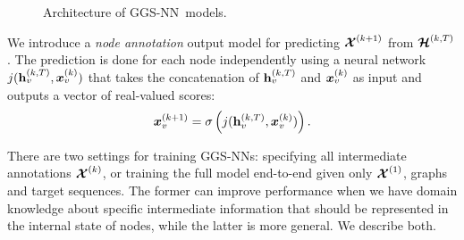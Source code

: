 \documentclass{article} %
\newcommand{\OurMethodShort}{GGS-NN}
\newcommand{\OurMethodShorts}{\OurMethodShort s}
\begin{document}
\begin{figure}[t]
  \begin{center}
  \end{center}
  \vspace{-2ex}
  \caption{Architecture of \OurMethodShort~models.}
  \vspace{-2ex}
  \label{fig:seq-architecture2}
\end{figure}

We introduce a \emph{node annotation} output model for predicting $\boldsymbol{\mathcal{X}}^{(k+1)}$
from $\boldsymbol{\mathcal{H}}^{(k,T)}$. The prediction is done for each node independently using
a neural network $j(\mathbf{h}_{v}^{(k,T)}, \boldsymbol{x}_v^{(k)})$ that takes the
concatenation of $\mathbf{h}_{v}^{(k,T)}$ and $\boldsymbol{x}_v^{(k)}$ as input and outputs a vector of
real-valued scores:
\begin{equation}
    \boldsymbol{x}_v^{(k+1)} = \sigma\left(j(\mathbf{h}_{v}^{(k,T)},
    \boldsymbol{x}_v^{(k)})\right).
\end{equation}

There are two settings for training \OurMethodShorts: specifying
all intermediate annotations $\boldsymbol{\mathcal{X}}^{(k)}$, or training the full model end-to-end given only
$\boldsymbol{\mathcal{X}}^{(1)}$, graphs and target sequences.
The former can improve performance when we have domain knowledge about specific
intermediate information that should be represented in the internal state of
nodes, while the latter is more general. We describe both.
\end{document}
